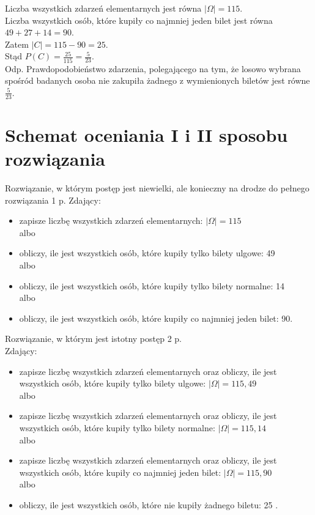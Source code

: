 \documentclass[10pt]{article}
\begin{document}
Liczba wszystkich zdarzeń elementarnych jest równa $|\Omega|=115$.\\
Liczba wszystkich osób, które kupiły co najmniej jeden bilet jest równa\\
$49+27+14=90$.\\
Zatem $|C|=115-90=25$.\\
Stąd $P(C)=\frac{25}{115}=\frac{5}{23}$.\\
Odp. Prawdopodobieństwo zdarzenia, polegającego na tym, że losowo wybrana spośród badanych osoba nie zakupiła żadnego z wymienionych biletów jest równe $\frac{5}{23}$.

\section*{Schemat oceniania I i II sposobu rozwiązania}
Rozwiązanie, w którym postęp jest niewielki, ale konieczny na drodze do pełnego rozwiązania 1 p. Zdający:

\begin{itemize}
  \item zapisze liczbę wszystkich zdarzeń elementarnych: $|\Omega|=115$\\
albo
  \item obliczy, ile jest wszystkich osób, które kupiły tylko bilety ulgowe: 49\\
albo
  \item obliczy, ile jest wszystkich osób, które kupiły tylko bilety normalne: 14\\
albo
  \item obliczy, ile jest wszystkich osób, które kupiły co najmniej jeden bilet: 90.
\end{itemize}

Rozwiązanie, w którym jest istotny postęp 2 p.\\
Zdający:

\begin{itemize}
  \item zapisze liczbę wszystkich zdarzeń elementarnych oraz obliczy, ile jest wszystkich osób, które kupiły tylko bilety ulgowe: $|\Omega|=115,49$\\
albo
  \item zapisze liczbę wszystkich zdarzeń elementarnych oraz obliczy, ile jest wszystkich osób, które kupiły tylko bilety normalne: $|\Omega|=115,14$\\
albo
  \item zapisze liczbę wszystkich zdarzeń elementarnych oraz obliczy, ile jest wszystkich osób, które kupiły co najmniej jeden bilet: $|\Omega|=115,90$\\
albo
  \item obliczy, ile jest wszystkich osób, które nie kupiły żadnego biletu: 25 .
\end{itemize}
\end{document}
